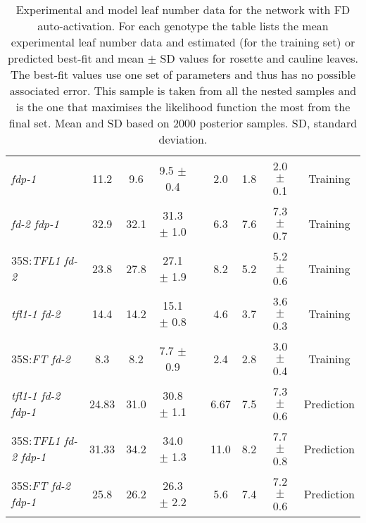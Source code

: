 \begin{table*}[!htb]
\begin{tabular}{@{}l@{\hspace{0.8em}}ccc@{\hspace{0.5em}}c@{\hspace{1.4em}}c@{\hspace{0.7em}}c@{\hspace{0.7em}}cc@{}}
      \emph{fdp-1}                & 11.2  & 9.6  &  9.5  $ \pm $  0.4  && 2.0  & 1.8  &  2.0 $ \pm $ 0.1   &  Training \\
      \emph{fd-2 fdp-1}           & 32.9  & 32.1 & 31.3  $ \pm $  1.0  && 6.3  & 7.6  &  7.3 $ \pm $ 0.7   &  Training\\ 
      35S:\emph{TFL1 fd-2}        & 23.8  & 27.8 & 27.1  $ \pm $  1.9  && 8.2  & 5.2  &  5.2 $ \pm $ 0.6   &  Training \\
      \emph{tfl1-1 fd-2}          & 14.4  & 14.2 & 15.1  $ \pm $  0.8  && 4.6  & 3.7  &  3.6 $ \pm $ 0.3   &  Training \\
      35S:\emph{FT fd-2}          & 8.3   & 8.2  &  7.7  $ \pm $  0.9  && 2.4  & 2.8  &  3.0 $ \pm $ 0.4   &  Training \\
      \emph{tfl1-1 fd-2 fdp-1}    & 24.83 & 31.0 & 30.8  $ \pm $  1.1  && 6.67 & 7.5  &  7.3 $ \pm $ 0.6   &  Prediction \\
      35S:\emph{TFL1 fd-2 fdp-1}  & 31.33 & 34.2 & 34.0  $ \pm $  1.3  && 11.0 & 8.2  &  7.7 $ \pm $ 0.8   &  Prediction \\
      35S:\emph{FT fd-2 fdp-1}    & 25.8  & 26.2 & 26.3  $ \pm $  2.2  && 5.6  & 7.4  &  7.2 $ \pm $ 0.6   &  Prediction \\
      \bottomrule
    \end{tabular}
    \caption{Experimental and model leaf number data for the network with FD auto-activation.
      For each genotype the table lists the mean experimental leaf number data and estimated (for the training set) or predicted best-fit and mean $\pm$ SD values for rosette and cauline leaves.
      The best-fit values use one set of parameters and thus has no possible associated error.
      This sample is taken from all the nested samples and is the one that maximises the likelihood function the most from the final set.
      Mean and SD based on 2000 posterior samples.
      SD, standard deviation.
    }
    \label{tab:postFDFDLeafNums}
\end{table*}

